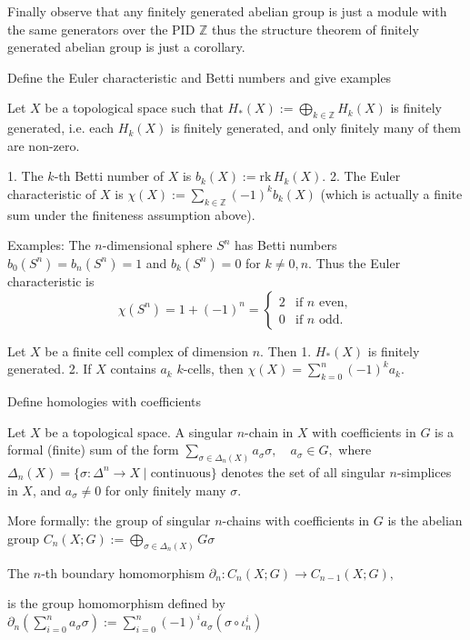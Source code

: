 Finally observe that any finitely generated abelian group is just a module with the same generators over the PID \( \mathbb{Z} \)
thus the structure theorem of finitely generated abelian group is just a corollary.

Define the Euler characteristic and Betti numbers and give examples

Let \(X\) be a topological space such that \(H_\ast(X) := \bigoplus_{k \in \mathbb{Z}} H_k(X)\) is finitely generated, i.e. 
each \(H_k(X)\) is finitely generated, and only finitely many of them are non-zero.

1. The \(k\)-th Betti number of \(X\) is \(b_k(X) := \text{rk} \, H_k(X)\).
2. The Euler characteristic of \(X\) is \(\chi(X) := \sum_{k \in \mathbb{Z}} (-1)^k b_k(X)\) 
(which is actually a finite sum under the finiteness assumption above).

Examples:
The \(n\)-dimensional sphere \(S^n\) has Betti numbers \(b_0(S^n) = b_n(S^n) = 1\) and 
\(b_k(S^n) = 0\) for \(k \neq 0, n\). Thus the Euler characteristic is
\[
\chi(S^n) = 1 + (-1)^n = 
\begin{cases}
2 & \text{if } n \text{ even}, \\
0 & \text{if } n \text{ odd}.
\end{cases}
\]

Let \(X\) be a finite cell complex of dimension \(n\). Then
1. \(H_*(X)\) is finitely generated.
2. If \(X\) contains \(a_k\) \(k\)-cells, then \(\chi(X) = \sum_{k=0}^n (-1)^k a_k\).


Define homologies with coefficients

Let \(X\) be a topological space.
A singular \(n\)-chain in \(X\) with coefficients in \(G\) is a formal (finite) sum of the form
\(\sum_{\sigma \in \Delta_n(X)} a_\sigma \sigma, \quad a_\sigma \in G,\)
where \(\Delta_n(X) = \{\sigma : \Delta^n \to X \mid \text{continuous}\}\) denotes the set of all singular \(n\)-simplices in \(X\), 
and \(a_\sigma \neq 0\) for only finitely many \(\sigma\).

More formally: the group of singular \(n\)-chains with coefficients in \(G\) is the abelian group
\(C_n(X; G) := \bigoplus_{\sigma \in \Delta_n(X)} G \sigma\)

The \(n\)-th boundary homomorphism \(\partial_n : C_n(X; G) \to C_{n-1}(X; G),\)

is the group homomorphism defined by
\(\partial_n \left( \sum_{i=0}^n a_\sigma \sigma \right) := \sum_{i=0}^n (-1)^i a_\sigma (\sigma \circ \iota_n^i)\)

